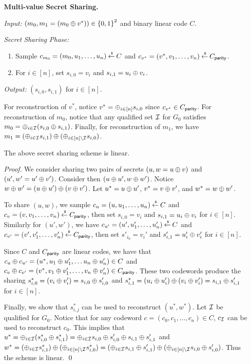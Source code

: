 \begin{boxedalgo}
	\textbf{Multi-value Secret Sharing.}
	
	\textit{Input:} $(m_0,m_1 = (m_0 \oplus v^*)) \in {\{0,1\}}^2$ and binary linear code $C$.
	
	\textit{Secret Sharing Phase:}
	\begin{enumerate}
		\item Sample $c_{m_0} = (m_0,u_1,\dotsc,u_n) \mathbin{\stackrel{\mbox{\,\tiny \$}}{\gets}} C$ and $c_{v^*} = (v^*, v_1,\dotsc, v_n) \mathbin{\stackrel{\mbox{\,\tiny \$}}{\gets}} C_{\mathsf{parity}}$.
		\item For $i \in [n]$, set $s_{i,0} = v_i$ and $s_{i,1} = u_i \oplus v_i$.
	\end{enumerate}
	
	\textit{Output:} $(s_{i,0}, s_{i,1})$ for $i \in [n]$.
\end{boxedalgo}

For reconstruction of $v^*$, notice $v^* = \oplus_{i \in [n]} s_{i,0}$ since $c_{v^*} \in C_{\mathsf{parity}}$.
For reconstruction of $m_0$, notice that any qualified set ${\mathcal I}$ for $G_0$ satisfies $m_0 = \oplus_{i \in {\mathcal I}} (s_{i,0} \oplus s_{i,1})$.
Finally, for reconstruction of $m_1$, we have $m_1 = (\oplus_{i \in {\mathcal I}} s_{i,1})\oplus(\oplus_{i \in [n]\setminus {\mathcal I}} s_{i,0})$.
\begin{myclaim}
	The above secret sharing scheme is linear.
\end{myclaim}
\begin{proof}
	We consider sharing two pairs of secrets $(u, w = u \oplus v)$ and $(u', w' = u' \oplus v')$.
	Consider then $(u\oplus u', w\oplus w')$.
	Notice $w\oplus w' = (u \oplus u') \oplus (v \oplus v')$.
	Let $u^* = u\oplus u'$, $v^* = v\oplus v'$, and $w^* = w\oplus w'$.
	
	To share $(u,w)$, we sample $c_u = (u, u_1,\dotsc, u_n) \mathbin{\stackrel{\mbox{\,\tiny \$}}{\gets}} C$ and $c_v = (v,v_1,\dotsc, v_n) \mathbin{\stackrel{\mbox{\,\tiny \$}}{\gets}} C_\mathsf{parity}$, then set $s_{i,0} = v_i$ and $s_{i,1} = u_i\oplus v_i$ for $i \in [n]$.
	Similarly for $(u',w')$, we have $c_{u'} = (u',u_1',\dotsc,u_n') \mathbin{\stackrel{\mbox{\,\tiny \$}}{\gets}} C$ and $c_{v'} = (v',v_1',\dotsc,v_n') \mathbin{\stackrel{\mbox{\,\tiny \$}}{\gets}} C_\mathsf{parity}$, then set $s'_{i_0} = v_i'$ and $s'_{i,1} = u_i' \oplus v_i'$ for $i \in [n]$.
	
	Since $C$ and $C_\mathsf{parity}$ are linear codes, we have that $c_u \oplus c_{u'} = (u^*, u_1\oplus u_1',\dotsc u_n \oplus u_n') \in C$ and $c_v \oplus c_{v'} = (v^*, v_1 \oplus v_1',\dotsc, v_n \oplus v_n') \in C_\mathsf{parity}$.
	These two codewords produce the sharing $s^*_{i,0} = (v_i\oplus v_i') = s_{i,0}\oplus s_{i,0}'$ and $s^*_{i,1} = (u_i\oplus u_i') \oplus (v_i \oplus v_i') = s_{i,1}\oplus s_{i,1}'$ for $i \in [n]$.
	
	Finally, we show that $s^*_{i,j}$ can be used to reconstruct $(u^*, w^*)$.
	Let ${\mathcal I}$ be qualified for $G_0$.
	Notice that for any codeword $c = (c_0, c_1,\dotsc,c_n) \in C$, $c_{\mathcal I}$ can be used to reconstruct $c_0$.
	This implies that $u^* = \oplus_{i \in {\mathcal I}} (s_{i,0}^* \oplus s_{i,1}^*) = \oplus_{i \in {\mathcal I}} s_{i,0}\oplus s_{i,0}' \oplus s_{i,1}\oplus s_{i,1}'$ and $w^* = (\oplus_{i \in {\mathcal I}} s^*_{i,1})\oplus (\oplus_{i \in [n]\setminus {\mathcal I}}s_{i,0}^*) = (\oplus_{i \in {\mathcal I}} s_{i,1}\oplus s'_{i,1}) \oplus (\oplus_{i \in [n]\setminus {\mathcal I}}s_{i,0}\oplus s_{i,0}')$.
	Thus the scheme is linear. \qed
\end{proof}


